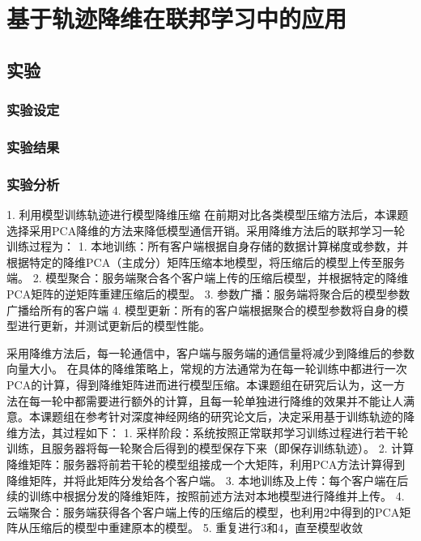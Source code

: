 \chapter{基于轨迹降维在联邦学习中的应用}

\section{}


\section{实验}
\subsection{实验设定}
\subsection{实验结果}
\subsection{实验分析}

1. 利用模型训练轨迹进行模型降维压缩
在前期对比各类模型压缩方法后，本课题选择采用PCA降维的方法来降低模型通信开销。采用降维方法后的联邦学习一轮训练过程为：
1. 本地训练：所有客户端根据自身存储的数据计算梯度或参数，并根据特定的降维PCA（主成分）矩阵压缩本地模型，将压缩后的模型上传至服务端。
2. 模型聚合：服务端聚合各个客户端上传的压缩后模型，并根据特定的降维PCA矩阵的逆矩阵重建压缩后的模型。
3. 参数广播：服务端将聚合后的模型参数广播给所有的客户端
4. 模型更新：所有的客户端根据聚合的模型参数将自身的模型进行更新，并测试更新后的模型性能。

采用降维方法后，每一轮通信中，客户端与服务端的通信量将减少到降维后的参数向量大小。
在具体的降维策略上，常规的方法通常为在每一轮训练中都进行一次PCA的计算，得到降维矩阵进而进行模型压缩。本课题组在研究后认为，这一方法在每一轮中都需要进行额外的计算，且每一轮单独进行降维的效果并不能让人满意。本课题组在参考针对深度神经网络的研究论文后，决定采用基于训练轨迹的降维方法，其过程如下：
1. 采样阶段：系统按照正常联邦学习训练过程进行若干轮训练，且服务器将每一轮聚合后得到的模型保存下来（即保存训练轨迹）。
2. 计算降维矩阵：服务器将前若干轮的模型组接成一个大矩阵，利用PCA方法计算得到降维矩阵，并将此矩阵分发给各个客户端。
3. 本地训练及上传：每个客户端在后续的训练中根据分发的降维矩阵，按照前述方法对本地模型进行降维并上传。
4. 云端聚合：服务端获得各个客户端上传的压缩后的模型，也利用2中得到的PCA矩阵从压缩后的模型中重建原本的模型。
5. 重复进行3和4，直至模型收敛
